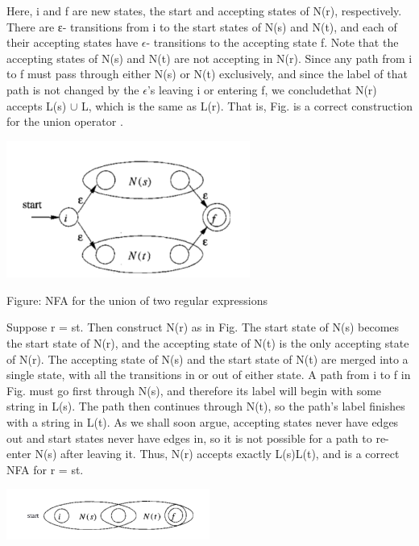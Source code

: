 \documentclass{article}
\begin{document}
\begin{enbref}
\begin{answer}
Here, i and f are new states, the start and accepting states of N(r), respectively. There are ε-
transitions from i to the start states of N(s) and N(t), and each of their accepting states have $\epsilon$-
transitions to the accepting state f. Note that the accepting states of N(s) and N(t) are not
accepting in N(r). Since any path from i to f must pass through either N(s) or N(t) exclusively,
and since the label of that path is not changed by the $\epsilon$'s leaving i or entering f, we concludethat N(r) accepts L(s) $\cup$ L, which is the same as L(r). That is, Fig. is a correct construction for the union operator .
\begin{center}
    \includegraphics[width=0.6\textwidth]{7.png}
\end{center}
\item \hspace{3cm} Figure: NFA for the union of two regular expressions\\
\item Suppose r = st. Then construct N(r) as in Fig. The start state of N(s) becomes the start state of
N(r), and the accepting state of N(t) is the only accepting state of N(r). The accepting state of
N(s) and the start state of N(t) are merged into a single state, with all the transitions in or out of
either state. A path from i to f in Fig. must go first through N(s), and therefore its label will
begin with some string in L(s).
The path then continues through N(t), so the path's label finishes with a string in L(t). As we
shall soon argue, accepting states never have edges out and start states never have edges in, so
it is not possible for a path to re-enter N(s) after leaving it. Thus, N(r) accepts exactly L(s)L(t), and is a correct NFA for r = st.\\
\begin{center}
    \includegraphics[width=0.5\textwidth]{6.png}

\end{center}
\end{answer}
\end{enbref}
\end{document}
